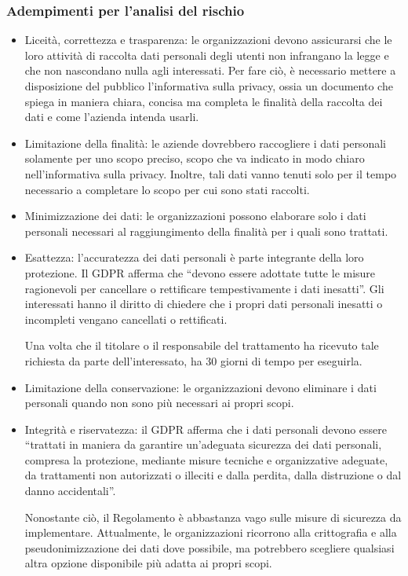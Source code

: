 \subsubsection{Adempimenti per l’analisi del rischio}
\begin{itemize}
    \item Liceità, correttezza e trasparenza: le organizzazioni devono assicurarsi che le loro attività di raccolta dati personali degli utenti non infrangano la  legge e che non nascondano nulla agli interessati. Per fare ciò, è necessario mettere a disposizione del pubblico l’informativa sulla privacy, ossia un documento che spiega in maniera chiara, concisa ma completa le finalità della raccolta dei dati e come l’azienda intenda usarli. 
    \item Limitazione della finalità: le aziende dovrebbero raccogliere i dati personali solamente per uno scopo preciso, scopo che va indicato in modo chiaro nell’informativa sulla privacy. Inoltre, tali dati vanno tenuti solo per il tempo necessario a completare lo scopo per cui sono stati raccolti.
    \item Minimizzazione dei dati: le organizzazioni possono elaborare solo i dati personali necessari al raggiungimento della finalità per i quali sono trattati.
    \item Esattezza: l’accuratezza dei dati personali è parte integrante della loro protezione. Il GDPR afferma che “devono essere adottate tutte le misure ragionevoli per cancellare o rettificare tempestivamente i dati inesatti”. Gli interessati hanno il diritto di chiedere che i propri dati personali inesatti o incompleti vengano cancellati o rettificati.
    
    Una volta che il titolare o il responsabile del trattamento ha ricevuto tale richiesta da parte dell’interessato, ha 30 giorni di tempo per eseguirla.
    \item Limitazione della conservazione: le organizzazioni devono eliminare i dati personali quando non sono più necessari ai propri scopi.
    \item Integrità e riservatezza: il GDPR afferma che i dati personali devono essere “trattati in maniera da garantire un’adeguata sicurezza dei dati personali, compresa la protezione, mediante misure tecniche e organizzative adeguate, da trattamenti non autorizzati o illeciti e dalla perdita, dalla distruzione o dal danno accidentali”.
    
    Nonostante ciò, il Regolamento è abbastanza vago sulle misure di sicurezza da implementare. Attualmente, le organizzazioni ricorrono alla crittografia e alla pseudonimizzazione dei dati dove possibile, ma potrebbero scegliere qualsiasi altra opzione disponibile più adatta ai propri scopi. 
    
\end{itemize}
